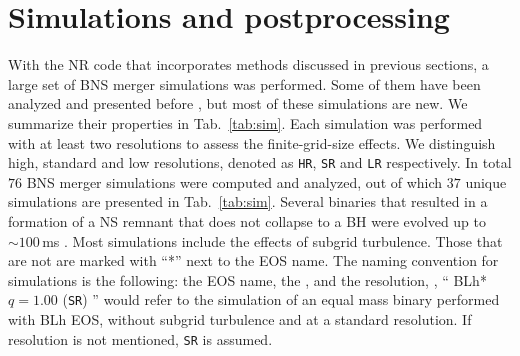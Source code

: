\section{Simulations and postprocessing} \label{sec:nr_methods:sims}


With the \ac{NR} code \wisky{} that incorporates methods discussed in 
previous sections, a large set of \ac{BNS} merger simulations was performed.
Some of them have been analyzed and presented before \citep{Perego:2019adq}, 
but most of these simulations are new. 
%
We summarize their properties in Tab.~\ref{tab:sim}. 
%
%
Each simulation was performed with at least two resolutions to assess the 
finite-grid-size effects. We distinguish high, standard and low resolutions, 
denoted as \texttt{HR}, \texttt{SR} and \texttt{LR} respectively. 
%
In total $76$ \ac{BNS} merger simulations were computed and analyzed, 
out of which $37$ unique simulations are presented in Tab.~\ref{tab:sim}. 
%
%
%
Several binaries that resulted in a formation of a \ac{NS} remnant 
that does not collapse to a \ac{BH} were evolved up to ${\sim}100\,$ms \pmerg.
%
Most simulations include the effects of subgrid turbulence. 
Those that are not are marked with ``*'' next to the \ac{EOS} name.
%
The naming convention for simulations is the following: 
the \ac{EOS} name, the \mr{}, and the resolution, \eg, 
`` BLh* $q=1.00$ (\texttt{SR}) '' would refer to the simulation of an 
equal mass binary performed with BLh \ac{EOS}, without subgrid 
turbulence and at a standard resolution. 
If resolution is not mentioned, \texttt{SR} is assumed.

